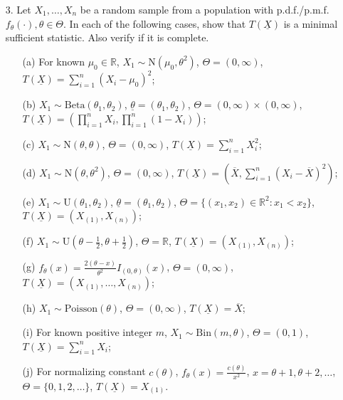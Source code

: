 \documentclass[11pt]{article}
\begin{document}
\begin{enumerate}
    \item[3.] Let $X_1, \dots, X_n$ be a random sample from a population with p.d.f./p.m.f. $f_\theta(\cdot), \theta \in \Theta$. In each of the following cases, show that $T(\underline{X})$ is a minimal sufficient statistic. Also verify if it is complete.
    \begin{enumerate}
        \item[(a)] For known $\mu_0 \in \mathbb{R}$, $X_1 \sim \text{N}(\mu_0, \theta^2)$, $\Theta = (0, \infty)$, $T(\underline{X}) = \sum_{i=1}^n (X_i - \mu_0)^2$;
        \item[(b)] $X_1 \sim \text{Beta}(\theta_1, \theta_2)$, $\underline{\theta} = (\theta_1, \theta_2)$, $\Theta = (0, \infty) \times (0, \infty)$, $T(\underline{X}) = \left( \prod_{i=1}^n X_i, \prod_{i=1}^n (1 - X_i) \right)$;
        \item[(c)] $X_1 \sim \text{N}(\theta, \theta)$, $\Theta = (0, \infty)$, $T(\underline{X}) = \sum_{i=1}^n X_i^2$;
        \item[(d)] $X_1 \sim \text{N}(\theta, \theta^2)$, $\Theta = (0, \infty)$, $T(\underline{X}) = \left( \overline{X}, \sum_{i=1}^n (X_i - \overline{X})^2 \right)$;
        \item[(e)] $X_1 \sim \text{U}(\theta_1, \theta_2)$, $\underline{\theta} = (\theta_1, \theta_2)$, $\Theta = \{(x_1, x_2) \in \mathbb{R}^2 : x_1 < x_2 \}$, $T(\underline{X}) = (X_{(1)}, X_{(n)})$;
        \item[(f)] $X_1 \sim \text{U}(\theta - \frac{1}{2}, \theta + \frac{1}{2})$, $\Theta = \mathbb{R}$, $T(\underline{X}) = (X_{(1)}, X_{(n)})$;
        \item[(g)] $f_\theta(x) = \frac{2(\theta - x)}{\theta^2} I_{(0, \theta)}(x)$, $\Theta = (0, \infty)$, $T(\underline{X}) = (X_{(1)}, \dots, X_{(n)})$;
        \item[(h)] $X_1 \sim \text{Poisson}(\theta)$, $\Theta = (0, \infty)$, $T(\underline{X}) = \overline{X}$;
        \item[(i)] For known positive integer $m$, $X_1 \sim \text{Bin}(m, \theta)$, $\Theta = (0, 1)$, $T(\underline{X}) = \sum_{i=1}^n X_i$;
        \item[(j)] For normalizing constant $c(\theta)$, $f_\theta(x) = \frac{c(\theta)}{x^2}$, $x = \theta + 1, \theta + 2, \dots$, $\Theta = \{0, 1, 2, \dots\}$, $T(\underline{X}) = X_{(1)}$.
    \end{enumerate}
\end{enumerate}
\end{document}
